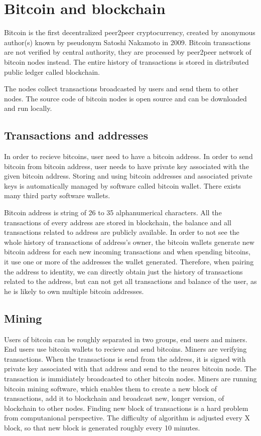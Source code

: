 \documentclass[
  digital, %
  table,   %
  lof,     %
  lot,     %
  oneside
]{fithesis3}
\begin{document}
\section{Bitcoin and blockchain}

Bitcoin is  the first decentralized peer2peer cryptocurrency, created by anonymous author(s) known by pseudonym Satoshi Nakamoto in 2009.
Bitcoin transactions are not verified by central authority, they are  
processed by peer2peer network of bitcoin nodes instead. 
The entire history of transactions is stored in distributed public ledger called blockchain.

The nodes collect transactions broadcasted by users and send them to other nodes.
The source code of bitcoin nodes is open source and can be downloaded and run locally. 

\subsection{Transactions and addresses}
In order to recieve bitcoins, user need to have a bitcoin address. In order to send bitcoin from bitcoin address,
 user needs to have private key associated with the given bitcoin address.
Storing and using bitcoin addresses and associated private keys is automatically managed
by software called bitcoin wallet. There exists many third party software wallets.

Bitcoin address is string of 26 to 35 alphanumerical characters.
All the transactions of every address are stored in blockchain, the balance and all transactions related to address are
publicly available.
In order to not see the whole history of transactions of address's owner,
the bitcoin wallets generate new bitcoin address for each new incoming transactions and when spending bitcoins, it use one or more of the addresses the wallet generated.
Therefore, when pairing the address to identity, we can directly obtain just the history of transactions related to the address,
but can not get all transactions and balance of the user, as he is likely to own multiple bitcoin addresses.

\subsection{Mining}
Users of bitcoin can be roughly separated in two groups, end users and miners.
End users use bitcoin wallets to recieve and send bitcoins.
Miners are verifying transactions. When the transactions is send from the address, 
it is signed with private key associated with that address and send to the neares bitcoin node.
The transaction is immidiately broadcasted to other bitcoin nodes.
Miners are running bitcoin mining software, which enables them to create a new block of transactions, add it to blockchain
and broadcast new, longer version, of blockchain to other nodes.
Finding new block of transactions is a hard problem from computanional perspective.
The difficulty of algorithm is adjusted every X block, so that new block is generated roughly every 10 minutes.
\end{document}

